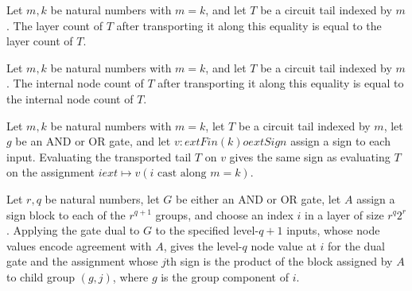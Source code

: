 \begin{theorem}
\label{FABL.circuitTail_layerCount_cast}
\leanok
{}
Let $m,k$ be natural numbers with $m=k$, and let $T$ be a circuit tail indexed by $m$.
The layer count of $T$ after transporting it along this equality is equal to the layer
count of $T$.
\end{theorem}

\begin{theorem}
\label{FABL.circuitTail_internalNodeCount_cast}
\leanok
{}
Let $m,k$ be natural numbers with $m=k$, and let $T$ be a circuit tail indexed by $m$.
The internal node count of $T$ after transporting it along this equality is equal to the
internal node count of $T$.
\end{theorem}

\begin{theorem}
\label{FABL.circuitTail_eval_cast}
\leanok
{}
Let $m,k$ be natural numbers with $m=k$, let $T$ be a circuit tail indexed by $m$, let
$g$ be an AND or OR gate, and let $v:	ext{Fin}(k)	o	ext{Sign}$ assign a sign to each
input. Evaluating the transported tail $T$ on $v$ gives the same sign as evaluating $T$
on the assignment $i	ext{ }\mapsto v(i\text{ cast along }m=k)$.
\end{theorem}

\begin{theorem}
\label{FABL.eval_parityNextLayer}
\leanok
{}
Let $r,q$ be natural numbers, let $G$ be either an AND or OR gate, let $A$ assign a sign
block to each of the $r^{q+1}$ groups, and choose an index $i$ in a layer of size
$r^q2^r$. Applying the gate dual to $G$ to the specified level-$q+1$ inputs, whose node
values encode agreement with $A$, gives the level-$q$ node value at $i$ for the dual
gate and the assignment whose $j$th sign is the product of the block assigned by $A$ to
child group $(g,j)$, where $g$ is the group component of $i$.
\end{theorem}

